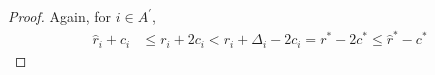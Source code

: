 \begin{proof}
  Again, for ${i} \in A^{'}$, 
  \begin{align*}
\hat{r}_{i} + c_{i}&\leq r_{i} + 2c_{i} 
 < r_{i} + \Delta_{i} - 2c_{i}
 = r^{*} -2c^{*} 
 \leq \hat{r}^{*} - c^{*}
  \end{align*}


% 
 

\end{proof}
